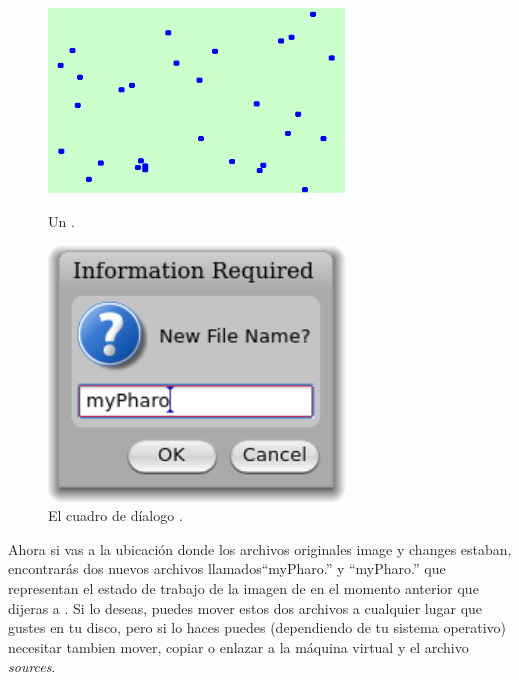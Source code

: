 \documentclass[a4paper,10pt,twoside]{book}
\begin{document}
\begin{figure}[htb]
\begin{minipage}[b]{0.48\textwidth}
\centerline {\includegraphics[width=0.7\textwidth]{atoms}}
\caption{Un \bam.}
\end{minipage}
\hfill
\begin{minipage}[b]{0.48\textwidth}
\centerline {\includegraphics[width=0.7\textwidth]{saveAs}}
\caption{El cuadro de d\'ialogo .}
\end{minipage}
\end{figure}


Ahora si vas a la ubicaci\'on donde los archivos originales image y changes estaban, encontrar\'as dos nuevos archivos llamados``myPharo.'' y ``myPharo.'' que representan el estado de trabajo de la imagen de \pharo en el momento anterior que dijeras a \pharo {}.
Si lo deseas, puedes mover estos dos archivos a cualquier lugar que gustes en tu disco, pero si lo haces puedes (dependiendo de tu sistema operativo) necesitar tambien mover, copiar o enlazar a la m\'aquina virtual y el archivo \emph{sources}.
\end{document}
